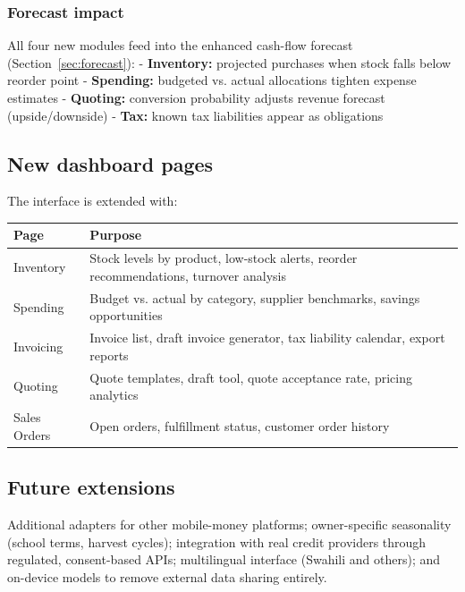 \documentclass[10pt,a4paper]{article}
\begin{document}
\subsubsection{Forecast impact}

All four new modules feed into the enhanced cash-flow forecast (Section~\ref{sec:forecast}):
- \textbf{Inventory:} projected purchases when stock falls below reorder point
- \textbf{Spending:} budgeted vs. actual allocations tighten expense estimates
- \textbf{Quoting:} conversion probability adjusts revenue forecast (upside/downside)
- \textbf{Tax:} known tax liabilities appear as obligations

\subsection{New dashboard pages}

The interface is extended with:

\begin{center}
\begin{tabularx}{\textwidth}{@{}p{2.8cm}Y@{}}
\toprule
\textbf{Page} & \textbf{Purpose}\\
\midrule
Inventory & Stock levels by product, low-stock alerts, reorder recommendations, turnover analysis\\
Spending & Budget vs. actual by category, supplier benchmarks, savings opportunities\\
Invoicing & Invoice list, draft invoice generator, tax liability calendar, export reports\\
Quoting & Quote templates, draft tool, quote acceptance rate, pricing analytics\\
Sales Orders & Open orders, fulfillment status, customer order history\\
\bottomrule
\end{tabularx}
\end{center}

\subsection{Future extensions}
Additional adapters for other mobile-money platforms; owner-specific seasonality (school terms, harvest cycles); integration with real credit providers through regulated, consent-based APIs; multilingual interface (Swahili and others); and on-device models to remove external data sharing entirely.

\appendix
\end{document}
